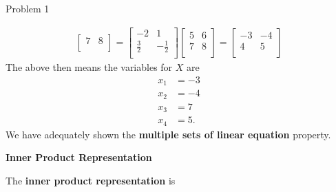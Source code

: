 \begin{problem}{Problem 1}
\begin{Highlight}[Solution]
\begin{align*}
\begin{bmatrix}
                7 & 8 \\
            \end{bmatrix}
            = 
            \begin{bmatrix}
                -2 & 1 \\
                \frac{3}{2} & -\frac{1}{2} \\
            \end{bmatrix}
            \begin{bmatrix}
                5 & 6 \\
                7 & 8 \\
            \end{bmatrix}
            = 
            \begin{bmatrix}
                -3 & -4 \\
                4 & 5 \\
            \end{bmatrix}
        \end{align*}
        The above then means the variables for $X$ are 
        \begin{align*}
            x_{1} & = -3 \\
            x_{2} & = -4 \\
            x_{3} & = 7 \\
            x_{4} & = 5.
        \end{align*}
        We have adequately shown the \textbf{multiple sets of linear equation} property. \vspace*{1em}

        \noindent \textbf{Inner Product Representation} \vspace*{1em}

        The \textbf{inner product representation} is


\end{Highlight}
\end{problem}
